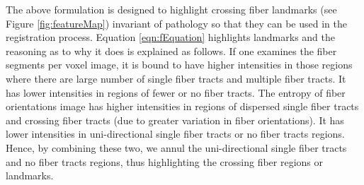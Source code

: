 \documentclass{llncs}
\begin{document}
The above formulation is designed to highlight crossing fiber landmarks (see Figure \ref{fig:featureMap}) invariant of pathology so that they can be used in the registration process. Equation \ref{eqn:fEquation} highlights landmarks and the reasoning as to why it does is explained as follows. If one examines the fiber segments per voxel image, it is bound to have higher intensities in those regions where there are large number of single fiber tracts and multiple fiber tracts. It has lower intensities in regions of fewer or no fiber tracts.  The entropy of fiber orientations image has higher intensities in regions of dispersed single fiber tracts and crossing fiber tracts (due to greater variation in fiber orientations). It has lower intensities in uni-directional single fiber tracts or no fiber tracts regions. Hence, by combining these two, we annul the uni-directional single fiber tracts and no fiber tracts regions, thus highlighting the crossing fiber regions or landmarks.
\end{document}
